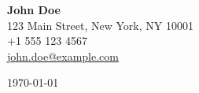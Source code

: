 \textbf{\large John Doe} \\
123 Main Street, New York, NY 10001 \\
+1 555 123 4567 \\
\href{mailto:john.doe@example.com}{john.doe@example.com}

\vspace{8pt}
\begin{flushright}
  \vspace{-20pt}
  \today
\end{flushright}
